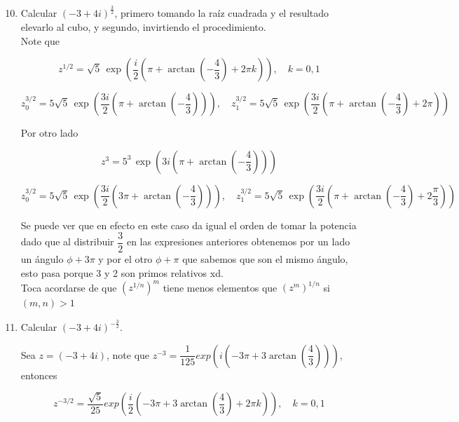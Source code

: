 \documentclass[11pt]{article}
\begin{document}
\begin{enumerate}
  \setcounter{enumi}{9}
  \item Calcular $(-3+4 i)^{\frac{3}{2}}$, primero tomando la raíz cuadrada y el resultado elevarlo al cubo, y segundo, invirtiendo el procedimiento.\\

  Note que

$$z^{1/2} = \sqrt{5} \, \exp \left( \frac{i}{2} \left( \pi + \arctan \left( -\frac{4}{3} \right) + 2 \pi k \right) \right), \quad k = 0, 1$$

$$z_0^{3/2}= 5 \sqrt{5} \, \exp \left( \frac{3i}{2} \left( \pi + \arctan \left( -\frac{4}{3} \right) \right) \right), \quad z_1^{3/2} = 5 \sqrt{5} \, \exp \left( \frac{3i}{2} \left( \pi + \arctan \left( -\frac{4}{3} \right) + 2 \pi \right) \right)$$

Por otro lado

$$z^3 = 5^3 \, \exp \left( 3i \left( \pi + \arctan \left( -\frac{4}{3} \right) \right) \right)$$

$$z_0^{3/2}= 5 \sqrt{5} \, \exp \left( \frac{3i}{2} \left( 3 \pi + \arctan \left( -\frac{4}{3} \right) \right) \right),\quad z_1^{3/2} = 5 \sqrt{5} \, \exp \left( \frac{3i}{2} \left( \pi + \arctan \left( -\frac{4}{3} \right) + 2 \frac{\pi}{3} \right) \right)
$$

Se puede ver que en efecto en este caso da igual el orden de tomar la potencia dado que al distribuir $\dfrac{3}{2}$ en las expresiones anteriores obtenemos por un lado un ángulo $\phi+3\pi$ y por el otro $\phi+\pi$ que sabemos que son el mismo ángulo, esto pasa  porque 3 y 2 son primos relativos xd.\\

Toca acordarse de que $\left(z^{1/n}\right)^m$ tiene menos elementos que $\left(z^{m}\right)^{1/n}$ si $(m,n)> 1$

  \item Calcular $(-3+4 i)^{-\frac{3}{2}}$.

  Sea $z=(-3+4i)$, note que $z^{-3}=\dfrac{1}{125} exp\left( i \left(-3\pi +3\arctan\left(\dfrac{4}{3}\right)\right)\right)$, entonces


$$z^{-3/2}=\dfrac{\sqrt{5} }{25} exp\left( \frac{i}{2} \left(-3\pi +3\arctan\left(\dfrac{4}{3}\right)+2\pi k\right)\right), \quad k=0,1$$
\end{enumerate}
\end{document}
